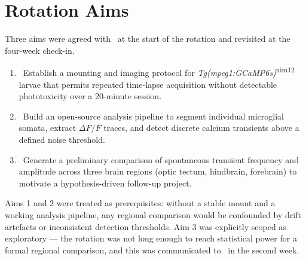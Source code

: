 \section{Rotation Aims}

Three aims were agreed with \reportsupervisor\ at the start of the rotation and revisited
at the four-week check-in.

\begin{aimbox}
\begin{enumerate}[leftmargin=1.6em, label=\textbf{Aim \arabic*.}, itemsep=0.4em]
  \item \faMicroscope\ Establish a mounting and imaging protocol for
    \emph{Tg(mpeg1:GCaMP6s)}\textsuperscript{nim12} larvae that permits repeated
    time-lapse acquisition without detectable phototoxicity over a 20-minute session.
  \item \faChartLine\ Build an open-source analysis pipeline to segment individual
    microglial somata, extract $\Delta F/F$ traces, and detect discrete calcium
    transients above a defined noise threshold.
  \item \faSearch\ Generate a preliminary comparison of spontaneous transient
    frequency and amplitude across three brain regions (optic tectum, hindbrain,
    forebrain) to motivate a hypothesis-driven follow-up project.
\end{enumerate}
\end{aimbox}

Aims 1 and 2 were treated as prerequisites: without a stable mount and a working
analysis pipeline, any regional comparison would be confounded by drift artefacts or
inconsistent detection thresholds. Aim 3 was explicitly scoped as exploratory --- the
rotation was not long enough to reach statistical power for a formal regional
comparison, and this was communicated to \reportsupervisor\ in the second week.
